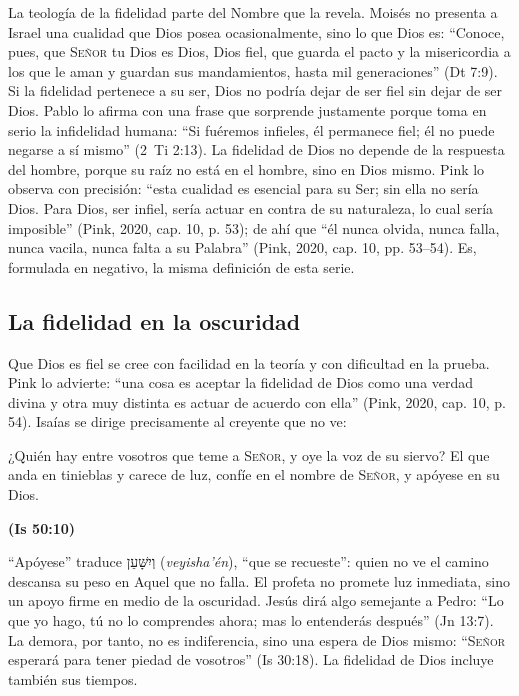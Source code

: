 \documentclass[11pt,letterpaper]{article}
\newcommand{\heb}[1]{\mbox{\foreignlanguage{hebrew}{#1}}}
\newcommand{\SENOR}{\textsc{Señor}}
\newcommand{\fuente}[1]{\par\hfill{\upshape\bfseries\small\textcolor{azul}{#1}}}
\begin{document}
La teología de la fidelidad parte del Nombre que la revela. Moisés no presenta a Israel una cualidad que Dios posea ocasionalmente, sino lo que Dios es: ``Conoce, pues, que \SENOR{} tu Dios es Dios, Dios fiel, que guarda el pacto y la misericordia a los que le aman y guardan sus mandamientos, hasta mil generaciones'' (Dt 7:9). Si la fidelidad pertenece a su ser, Dios no podría dejar de ser fiel sin dejar de ser Dios. Pablo lo afirma con una frase que sorprende justamente porque toma en serio la infidelidad humana: ``Si fuéremos infieles, él permanece fiel; él no puede negarse a sí mismo'' (2~Ti 2:13). La fidelidad de Dios no depende de la respuesta del hombre, porque su raíz no está en el hombre, sino en Dios mismo. Pink lo observa con precisión: ``esta cualidad es esencial para su Ser; sin ella no sería Dios. Para Dios, ser infiel, sería actuar en contra de su naturaleza, lo cual sería imposible'' (Pink, 2020, cap. 10, p. 53); de ahí que ``él nunca olvida, nunca falla, nunca vacila, nunca falta a su Palabra'' (Pink, 2020, cap. 10, pp. 53--54). Es, formulada en negativo, la misma definición de esta serie.

\subsection{La fidelidad en la oscuridad}
Que Dios es fiel se cree con facilidad en la teoría y con dificultad en la prueba. Pink lo advierte: ``una cosa es aceptar la fidelidad de Dios como una verdad divina y otra muy distinta es actuar de acuerdo con ella'' (Pink, 2020, cap. 10, p. 54). Isaías se dirige precisamente al creyente que no ve:

\begin{cita}¿Quién hay entre vosotros que teme a \SENOR, y oye la voz de su siervo? El que anda en tinieblas y carece de luz, confíe en el nombre de \SENOR, y apóyese en su Dios.\fuente{(Is 50:10)}\end{cita}

``Apóyese'' traduce \heb{וְיִשָּׁעֵן} (\emph{veyisha'én}), ``que se recueste'': quien no ve el camino descansa su peso en Aquel que no falla. El profeta no promete luz inmediata, sino un apoyo firme en medio de la oscuridad. Jesús dirá algo semejante a Pedro: ``Lo que yo hago, tú no lo comprendes ahora; mas lo entenderás después'' (Jn 13:7). La demora, por tanto, no es indiferencia, sino una espera de Dios mismo: ``\SENOR{} esperará para tener piedad de vosotros'' (Is 30:18). La fidelidad de Dios incluye también sus tiempos.
\end{document}
